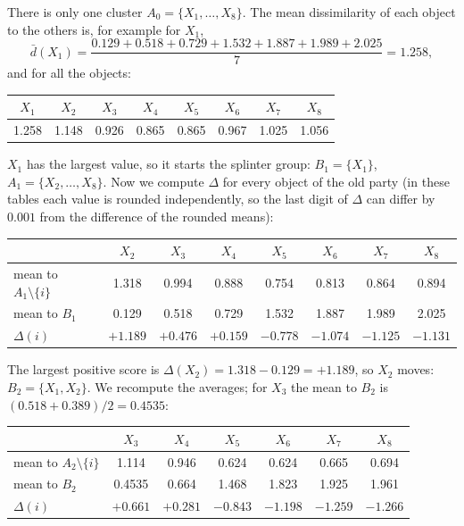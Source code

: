 \begin{example}[DIANA]
 There is only one cluster $A_0 = \{X_1, \dots, X_8\}$. The mean dissimilarity of each object to the others is, for example for $X_1$,
\[
  \bar d(X_1) = \frac{0.129 + 0.518 + 0.729 + 1.532 + 1.887 + 1.989 + 2.025}{7} = 1.258,
\]
and for all the objects:
\begin{center}
\begin{tabular}{@{}cccccccc@{}}
\toprule
$X_1$ & $X_2$ & $X_3$ & $X_4$ & $X_5$ & $X_6$ & $X_7$ & $X_8$ \\
\midrule
\textcolor{red!70!black}{1.258} & 1.148 & 0.926 & 0.865 & 0.865 & 0.967 & 1.025 & 1.056 \\
\bottomrule
\end{tabular}
\end{center}
$X_1$ has the largest value, so it starts the splinter group: $B_1 = \{X_1\}$, $A_1 = \{X_2, \dots, X_8\}$. Now we compute $\Delta$ for every object of the old party (in these tables each value is rounded independently, so the last digit of $\Delta$ can differ by $0.001$ from the difference of the rounded means):
\begin{center}
\begin{tabular}{@{}lccccccc@{}}
\toprule
 & $X_2$ & $X_3$ & $X_4$ & $X_5$ & $X_6$ & $X_7$ & $X_8$ \\
\midrule
mean to $A_1 \setminus \{i\}$ & 1.318 & 0.994 & 0.888 & 0.754 & 0.813 & 0.864 & 0.894 \\
mean to $B_1$ & 0.129 & 0.518 & 0.729 & 1.532 & 1.887 & 1.989 & 2.025 \\
$\Delta(i)$ & \textcolor{red!70!black}{$+1.189$} & $+0.476$ & $+0.159$ & $-0.778$ & $-1.074$ & $-1.125$ & $-1.131$ \\
\bottomrule
\end{tabular}
\end{center}
The largest positive score is $\Delta(X_2) = 1.318 - 0.129 = +1.189$, so $X_2$ moves: $B_2 = \{X_1, X_2\}$. We recompute the averages; for $X_3$ the mean to $B_2$ is $(0.518 + 0.389)/2 = 0.4535$:
\begin{center}
\begin{tabular}{@{}lcccccc@{}}
\toprule
 & $X_3$ & $X_4$ & $X_5$ & $X_6$ & $X_7$ & $X_8$ \\
\midrule
mean to $A_2 \setminus \{i\}$ & 1.114 & 0.946 & 0.624 & 0.624 & 0.665 & 0.694 \\
mean to $B_2$ & 0.4535 & 0.664 & 1.468 & 1.823 & 1.925 & 1.961 \\
$\Delta(i)$ & \textcolor{red!70!black}{$+0.661$} & $+0.281$ & $-0.843$ & $-1.198$ & $-1.259$ & $-1.266$ \\

\end{tabular}
\end{center}
\end{example}
